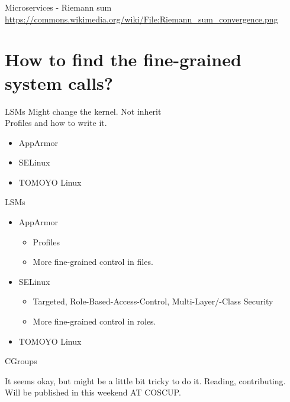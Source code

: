 \documentclass{beamer}
\begin{document}
\begin{CJK*}{UTF8}{bsmi}
\begin{frame}{Microservices - Riemann sum}
    \footnotesize
    \url{https://commons.wikimedia.org/wiki/File:Riemann_sum_convergence.png}
  \end{frame}

  \section{How to find the fine-grained system calls?}
  \begin{frame}{LSMs}
    Might change the kernel. {\color{red} Not inherit}\\
    Profiles and how to write it.
    \begin{itemize}
      \item AppArmor
      \item SELinux
      \item TOMOYO Linux
    \end{itemize}
  \end{frame}

  \begin{frame}{LSMs}
    \begin{itemize}
      \item AppArmor
            \begin{itemize}
              \item Profiles
              \item More fine-grained control in files.
            \end{itemize}
      \item SELinux
            \begin{itemize}
              \item Targeted, Role-Based-Access-Control, Multi-Layer/-Class Security
              \item More fine-grained control in roles.
            \end{itemize}
      \item TOMOYO Linux
    \end{itemize}
  \end{frame}

  \begin{frame}{CGroups}
    \begin{multicols*}{2}
      It seems okay, but might be a little bit tricky to do it.
      \newline
      \hfill
      \newline
      Reading, contributing.
      \newline
      \hfill
      \newline
      Will be published in this weekend AT COSCUP.


\end{multicols*}
\end{frame}
\end{CJK*}
\end{document}
